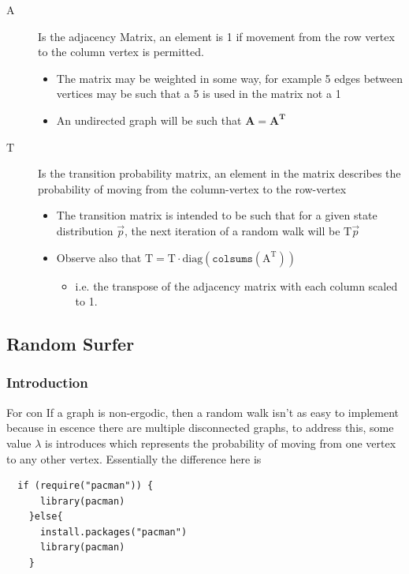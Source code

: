\documentclass[11pt]{article}
\begin{document}
\begin{description}
\item[{\(\mathrm{A}\)}] Is the adjacency Matrix, an element is 1 if movement from the row vertex to the column vertex is permitted.
\begin{itemize}
\item The matrix may be weighted in some way, for example 5 edges between vertices may be such that a 5 is used in the matrix not a 1
\item An undirected graph will be such that \(\mathbf{A} = \mathbf{A}^{\mathrm{\mathbf{T}}}\)
\end{itemize}
\item[{\(\mathrm{T}\)}] Is the transition probability matrix, an element in the matrix describes the probability of moving from the column-vertex to the row-vertex
\begin{itemize}
\item The transition matrix is intended to be such that for a given state distribution \(\vec{p}\), the next iteration of a random walk will be \(\mathrm{T}\vec{p}\)
\item Observe also that \(\mathrm{T} = \mathrm{T} \cdot \mathrm{diag}(\mathtt{colsums}(\mathrm{A^{\mathrm{T}}}))\)
\begin{itemize}
\item i.e. the transpose of the adjacency matrix with each column scaled to 1.
\end{itemize}
\end{itemize}
\end{description}

\subsection{Random Surfer}
\label{sec:org46e2db1}
\subsubsection{Introduction}
\label{sec:orgb663bbb}
For con If a graph is non-ergodic, then a random walk isn't as easy to implement
because in escence there are multiple disconnected graphs, to address this, some
value \(\lambda\) is introduces which represents the probability of moving from
one vertex to any other vertex. Essentially the difference here is

\lstset{language=r,label= ,caption= ,captionpos=b,numbers=none}
\begin{lstlisting}
  if (require("pacman")) {
      library(pacman)
    }else{
      install.packages("pacman")
      library(pacman)
    }
\end{lstlisting}
\end{document}
